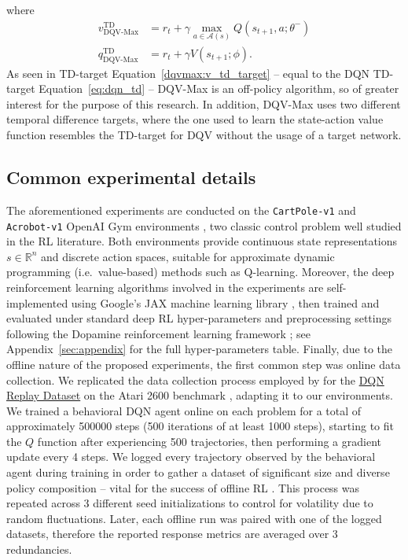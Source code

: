 where
\begin{align}
  v^{\scriptscriptstyle \textrm{TD}}_{\scriptscriptstyle
  \textrm{DQV-Max}}&=r_t+\gamma\max_{a\in\mathcal{A}\left(s\right)}Q\left(s_{t+1},a;\theta^{-}\right)
  \label{dqvmax:v_td_target}\\
  q^{\scriptscriptstyle \textrm{TD}}_{\scriptscriptstyle \textrm{DQV-Max}}&=r_t+\gamma
  V\left(s_{t+1};\phi\right)\label{dqvmax:q_td_target}.
\end{align} As seen in TD-target
Equation~\ref{dqvmax:v_td_target} -- equal to the DQN TD-target
Equation~\ref{eq:dqn_td} -- DQV-Max is an off-policy algorithm, so
of greater interest for the purpose of this research. In addition,
DQV-Max uses two different temporal difference targets, where the one
used to learn the state-action value function resembles the TD-target
for DQV without the usage of a target network.

\subsection{Common experimental details}
The aforementioned experiments are conducted on the
\texttt{CartPole-v1} and \texttt{Acrobot-v1} OpenAI Gym environments
\citep{https://doi.org/10.48550/arxiv.1606.01540}, two classic control
problem well studied in the RL literature. Both environments
provide continuous state representations $s\in \mathbb{R}^n$ and
discrete action spaces, suitable for approximate dynamic programming
(i.e.\ value-based) methods such as Q-learning. Moreover, the
deep reinforcement learning algorithms involved in the experiments are
self-implemented using Google's JAX machine learning library
\citep{jax2018github}, then trained and evaluated under standard deep
RL hyper-parameters and preprocessing settings following the Dopamine
reinforcement
learning framework \citep{castro18dopamine}; see
Appendix~\ref{sec:appendix} for the full hyper-parameters
table. Finally, due to the offline nature of the proposed experiments,
the first common step was online data collection. We replicated the
data collection process employed by \citet{agarwal2020optimistic} for
the \href{https://research.google/tools/datasets/dqn-replay/}{DQN
  Replay Dataset} on the Atari 2600 benchmark
\citep{bellemare2013arcade}, adapting it to our environments. We
trained a behavioral DQN agent online on each problem for a total of
approximately 500000 steps (500 iterations of at least 1000 steps),
starting to fit the $Q$ function after experiencing 500
trajectories, then performing a gradient update every 4 steps. We
logged every trajectory observed by the behavioral agent during
training in order to gather a dataset of significant size and diverse
policy composition -- vital for the success of offline RL
\citep{agarwal2020optimistic}. This process was repeated across 3
different seed initializations to control for volatility due to random
fluctuations. Later, each offline run was paired with one of the
logged datasets, therefore the reported response metrics are averaged
over 3 redundancies.

